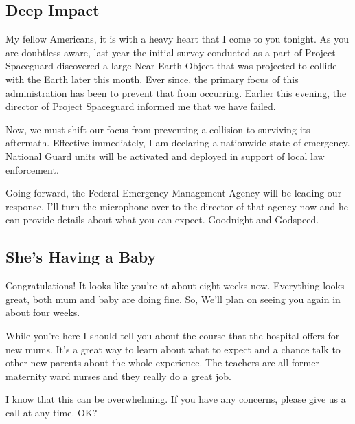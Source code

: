 \documentclass[12pt, a5paper, parskip=half-]{scrartcl}
\begin{document}
\subsection*{Deep Impact}
My fellow Americans, it is with a heavy heart that I come to you tonight. 
As you are doubtless aware, last year the initial survey conducted as a part of Project Spaceguard discovered a large Near Earth Object that was projected to collide with the Earth later this month.
Ever since, the primary focus of this administration has been to prevent that from occurring. Earlier this evening, the director of Project Spaceguard informed me that we have failed.

Now, we must shift our focus from preventing a collision to surviving its aftermath.
Effective immediately, I am declaring a nationwide state of emergency.  National Guard units will be activated and deployed in support of local law enforcement. 

Going forward, the Federal Emergency Management Agency will be leading our response.
I'll turn the microphone over to the director of that agency now and he can provide details about what you can expect.
Goodnight and Godspeed.


\subsection*{She's Having a Baby}
Congratulations! It looks like you're at about eight weeks now.
Everything looks great, both mum and baby are doing fine. 
So, We'll plan on seeing you again in about four weeks.

While you're here I should tell you about the course that the hospital offers for new mums.
It's a great way to learn about what to expect and a chance talk to other new parents about the whole experience. 
The teachers are all former maternity ward nurses and they really do a great job.

I know that this can be overwhelming. If you have any concerns, please give us a call at any time.  OK?

\newpage
\end{document}
